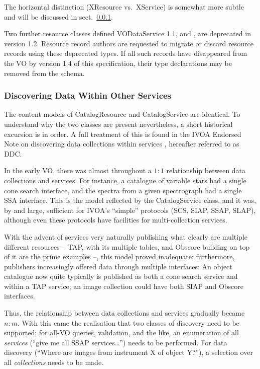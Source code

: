 \documentclass[11pt,a4paper]{ivoa}
\begin{document}
The horizontal distinction (XResource vs.~XService) is somewhat more
subtle and will be discussed in sect.~\ref{sect:discoverdata}.

Two further resource classes defined VODataService 1.1,
 and ,
are deprecated in version 1.2.
Resource record authors are requested to migrate or discard resource
records using these deprecated types.  If all such records have
disappeared from the VO by version 1.4 of this specification, their
type declarations may be removed from the schema.

\subsubsection{Discovering Data Within Other Services}
\label{sect:discoverdata}

The content models of CatalogResource and CatalogService are identical.
To understand why the two classes are present nevertheless, a short
historical excursion is in order.  A full treatment of this is found in
the IVOA Endorsed Note on discovering data collections within services
\citep{2019ivoa.spec.0520D}, hereafter referred to as DDC.

In the early VO, there was almost throughout a $1:1$ relationship between
data collections and services.  For instance, a catalogue of variable
stars had a single cone search interface, and the spectra from a given
spectrograph had a single SSA interface.  This is the model reflected by
the CatalogService class, and it was, by and large, sufficient for
IVOA's ``simple'' protocols (SCS, SIAP, SSAP, SLAP), although even these
protocols have facilities for multi-collection services.

With the advent of services very naturally publishing what clearly
are multiple different resources -- TAP, with its multiple tables, and
Obscore building on top of it are the prime examples --, this model
proved inadequate; furthermore, publishers increasingly offered data
through multiple interfaces: An object catalogue now quite typically is
published as both a cone search service and within a TAP service; an
image collection could have both SIAP and Obscore interfaces.

Thus, the relationship between data collections and services gradually
became $n:m$.  With this came the realisation that two classes of
discovery need to be supported; for all-VO queries, validation, and the
like, an enumeration of all \emph{services} (``give me all SSAP
services\dots'') needs to be performed.  For data discovery (``Where are
images from instrument X of object Y?''), a selection over all
\emph{collections} needs to be made.
\end{document}
